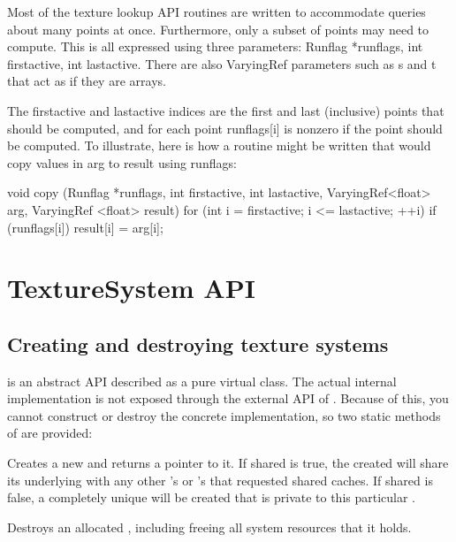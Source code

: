 Most of the texture lookup API routines are written to accommodate
queries about many points at once.  Furthermore, only a subset of
points may need to compute.  This is all expressed using three
parameters:  {\cf Runflag *runflags, int firstactive, int lastactive}.
There are also {\cf VaryingRef} parameters such as {\cf s} and {\cf t}
that act as if they are arrays.

The {\cf firstactive} and {\cf lastactive} indices are the first and
last (inclusive) points that should be computed, and for each point
{\cf runflags[i]} is nonzero if the point should be computed.  To
illustrate, here is how a routine might be written that would copy
values in {\cf arg} to {\cf result} using runflags:

\begin{code}
        void copy (Runflag *runflags, int firstactive, int lastactive,
                   VaryingRef<float> arg, VaryingRef <float> result)
        {
            for (int i = firstactive; i <= lastactive;  ++i)
                if (runflags[i])
                    result[i] = arg[i];
        }
\end{code}


\newpage
\section{TextureSystem API}
\label{sec:texturesys:api}

\subsection{Creating and destroying texture systems}
\label{sec:texturesys:api:createdestroy}

\TextureSystem is an abstract API described as a pure
virtual class.  The actual internal implementation is not exposed
through the external API of \product.  Because of this, you cannot
construct or destroy the concrete implementation, so two static
methods of \TextureSystem are provided:

Creates a new \TextureSystem and returns a pointer to it.
If {\cf shared} is {\cf true}, the \TextureSystem created will share its
underlying \ImageCache with any other \TextureSystem's or \ImageCache's
that requested shared caches.  If {\cf shared} is {\cf false}, a
completely unique \ImageCache will be created that is private to this
particular \TextureSystem.
\apiend

Destroys an allocated \TextureSystem, including freeing all system
resources that it holds.

